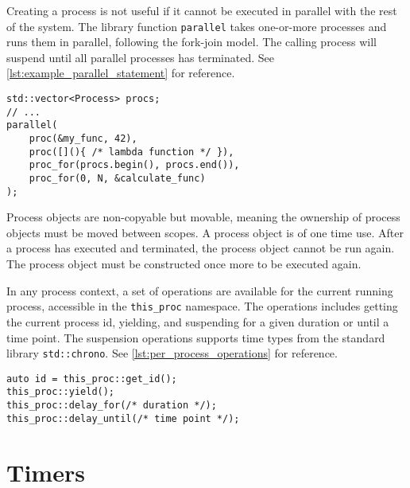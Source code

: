 Creating a process is not useful if it cannot be executed in parallel with the rest of the system. The library function \lstinline[style={CustomC++}]|parallel| takes one\hyp{}or\hyp{}more processes and runs them in parallel, following the fork\hyp{}join model. The calling process will suspend until all parallel processes has terminated. See \cref{lst:example_parallel_statement} for reference.

\begin{lstfloat}
\begin{lstlisting}[caption={Example of the parallel statement.}, label={lst:example_parallel_statement}, style={CustomC++}, xleftmargin={2em}]
std::vector<Process> procs;
// ...
parallel(
    proc(&my_func, 42),
    proc([](){ /* lambda function */ }),
    proc_for(procs.begin(), procs.end()),
    proc_for(0, N, &calculate_func)
);
\end{lstlisting}
\end{lstfloat}

Process objects are non\hyp{}copyable but movable, meaning the ownership of process objects must be moved between scopes. A process object is of one time use. After a process has executed and terminated, the process object cannot be run again. The process object must be constructed once more to be executed again. 

In any process context, a set of operations are available for the current running process, accessible in the \lstinline[style={CustomC++}]|this_proc| namespace. The operations includes getting the current process id, yielding, and suspending for a given duration or until a time point. The suspension operations supports time types from the standard library \lstinline[style={CustomC++}]|std::chrono|. See \cref{lst:per_process_operations} for reference.

\begin{lstfloat}
\begin{lstlisting}[caption={Per process operations for the current executing process.}, label={lst:per_process_operations}, style={CustomC++}, xleftmargin={2em}]
auto id = this_proc::get_id();
this_proc::yield();
this_proc::delay_for(/* duration */);
this_proc::delay_until(/* time point */);
\end{lstlisting}
\end{lstfloat}


\section{Timers}
\label{sec:timer_example}


